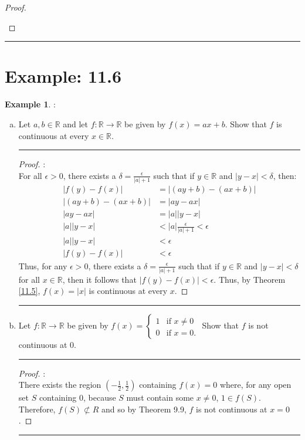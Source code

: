 \documentclass[openany, amssymb, psamsfonts]{amsart}
\newcommand{\bbR}{\mathbb{R}}
\theoremstyle{definition}
\newtheorem{exmp}{Example}[section]
\numberwithin{equation}{section}
\begin{document}
\begin{proof}
\begin{enumerate}
\begin{enumerate}
\end{enumerate}
\end{enumerate}
\end{proof} \vspace{4pt}     \hrule   \vspace{4pt}

\section*{Example: 11.6}
\begin{exmp}:\\
\label{11.6}
	\begin{enumerate}[(a)]
		\item Let $a, b\in \bbR$ and let $f\colon \bbR \to \bbR$ be given by $f(x) = ax + b$. Show that $f$ is continuous at every $x \in \bbR$.
   \vspace{4pt}     \hrule   \vspace{4pt}\begin{proof}:\\
For all $\epsilon>0$, there exists a $\delta = \frac{\epsilon}{|a|+1}$ such that if $y\in \bbR$ and $|y-x|< \delta$, then:
\begin{align*}
|f(y) - f(x)| &= |(ay+b)-(ax+b)|\\
|(ay+b)-(ax+b)|&=  |ay-ax|\\
|ay-ax| &= |a||y-x|\\
|a||y-x|&< |a|\frac{\epsilon}{|a|+1}< \epsilon\\
|a||y-x| &< \epsilon\\
|f(y) - f(x)| &< \epsilon
\end{align*}
Thus, for any $\epsilon>0$, there exists a $\delta = \frac{\epsilon}{|a|+1}$ such that if $y\in \bbR$ and $|y-x|<\delta$ for all $x\in \bbR$, then it follows that $|f(y)-f(x)|<\epsilon$. Thus, by Theorem \ref{11.5}, $f(x) = |x|$ is continuous at every $x$.
\end{proof} \vspace{4pt}     \hrule   \vspace{4pt}
		\item Let $f\colon \bbR \to \bbR$ be given by $f(x) = 
		\begin{cases}
			1 & \text{if } x \neq 0 \\
			0 & \text{if }x = 0.
		\end{cases}$ \hspace{10pt}
		Show that $f$ is not continuous at $0$.
   \vspace{4pt}     \hrule   \vspace{4pt}\begin{proof}:\\
There exists the region $(-\frac{1}{2}, \frac{1}{2})$ containing $f(x) = 0$ where, for any open set $S$ containing $0$, because $S$ must contain some $x\neq 0$, $1\in f(S)$. Therefore, $f(S) \not \subset R$ and so by Theorem 9.9, $f$ is not continuous at $x=0$.
\end{proof} \vspace{4pt}     \hrule   \vspace{4pt}
	\end{enumerate}
\end{exmp} 
\end{document}
